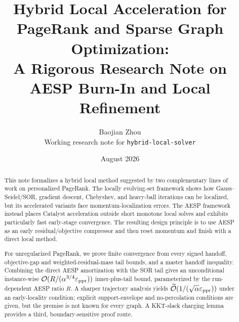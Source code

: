\documentclass[11pt]{article}
\title{Hybrid Local Acceleration for PageRank and Sparse Graph Optimization:\\
A Rigorous Research Note on AESP Burn-In and Local Refinement}
\author{Baojian Zhou\\
\small Working research note for \texttt{hybrid-local-solver}}
\date{August 2026}
\begin{document}
\maketitle

\begin{abstract}
This note formalizes a hybrid local method suggested by two complementary
lines of work on personalized PageRank. The locally evolving-set framework
shows how Gauss--Seidel/SOR, gradient descent, Chebyshev, and heavy-ball
iterations can be localized, but its accelerated variants face
momentum-localization errors. The AESP framework instead places Catalyst
acceleration outside short monotone local solves and exhibits particularly
fast early-stage convergence. The resulting design principle is to use AESP
as an early residual/objective compressor and then reset momentum and finish
with a direct local method.

For unregularized PageRank, we prove finite convergence from every signed
handoff, objective-gap and weighted-residual-mass tail bounds, and a master
handoff inequality. Combining the direct AESP amortization with the SOR tail
gives an unconditional instance-wise
$\mathcal{O}(R/(\alpha^{3/4}\varepsilon_{\mathrm{ppr}}))$ inner-plus-tail bound, parameterized by the
run-dependent AESP ratio $R$. A sharper trajectory analysis yields
$\widetilde{\mathcal{O}}(1/(\sqrt\alpha\varepsilon_{\mathrm{ppr}}))$ under an early-locality condition; explicit
support-envelope and no-percolation conditions are given, but the premise is
not known for every graph. A KKT-slack charging lemma provides a third,
boundary-sensitive proof route.


\end{abstract}
\end{document}

